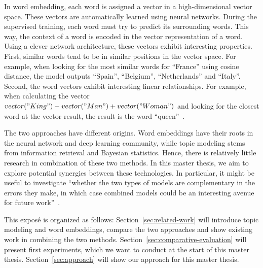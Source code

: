 \documentclass{sig-alternate-05-2015}
\begin{document}
In word embedding, each word is assigned a vector in a high-dimensional vector space.
These vectors are automatically learned using neural networks.
During the supervised training, each word must try to predict its surrounding words.
This way, the context of a word is encoded in the vector representation of a word.
Using a clever network architecture, these vectors exhibit interesting properties.
First, similar words tend to be in similar positions in the vector space.
For example, when looking for the most similar words for ``France'' using cosine distance, the model outputs ``Spain'', ``Belgium'', ``Netherlands'' and ``Italy''.
Second, the word vectors exhibit interesting linear relationships.
For example, when calculating the vector $vector("King") - vector("Man") + vector("Woman")$ and looking for the closest word at the vector result, the result is the word ``queen''~\cite{Mikolov2013b}.

The two approaches have different origins.
Word embeddings have their roots in the neural network and deep learning community, while topic modeling stems from information retrieval and Bayesian statistics.
Hence, there is relatively little research in combination of these two methods.
In this master thesis, we aim to explore potential synergies between these technologies.
In particular, it might be useful to investigate ``whether the two types of models are complementary in the errors they make, in which case combined models could be an interesting avenue for future work''~\cite{Baroni2014}.

This expos\'e is organized as follows: Section~\ref{sec:related-work} will introduce topic modeling and word embeddings, compare the two approaches and show existing work in combining the two methods.
Section~\ref{sec:comparative-evaluation} will present first experiments, which we want to conduct at the start of this master thesis.
Section~\ref{sec:approach} will show our approach for this master thesis.
\end{document}

